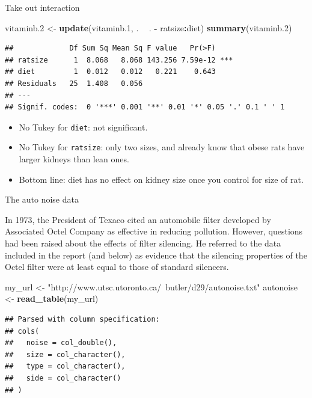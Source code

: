 \documentclass[ignorenonframetext,]{beamer}
\newenvironment{Shaded}{\begin{snugshade}}{\end{snugshade}}
\newcommand{\FloatTok}[1]{\textcolor[rgb]{0.00,0.00,0.81}{#1}}
\newcommand{\KeywordTok}[1]{\textcolor[rgb]{0.13,0.29,0.53}{\textbf{#1}}}
\newcommand{\NormalTok}[1]{#1}
\newcommand{\OperatorTok}[1]{\textcolor[rgb]{0.81,0.36,0.00}{\textbf{#1}}}
\newcommand{\StringTok}[1]{\textcolor[rgb]{0.31,0.60,0.02}{#1}}
\begin{document}
\begin{frame}[fragile]{Take out interaction}
\protect\hypertarget{take-out-interaction}{}

\begin{Shaded}
\begin{Highlighting}[]
\NormalTok{vitaminb}\FloatTok{.2}\NormalTok{ <-}\StringTok{ }\KeywordTok{update}\NormalTok{(vitaminb}\FloatTok{.1}\NormalTok{, . }\OperatorTok{~}\StringTok{ }\NormalTok{. }\OperatorTok{-}\StringTok{ }\NormalTok{ratsize}\OperatorTok{:}\NormalTok{diet)}
\KeywordTok{summary}\NormalTok{(vitaminb}\FloatTok{.2}\NormalTok{)}
\end{Highlighting}
\end{Shaded}

\begin{verbatim}
##             Df Sum Sq Mean Sq F value   Pr(>F)    
## ratsize      1  8.068   8.068 143.256 7.59e-12 ***
## diet         1  0.012   0.012   0.221    0.643    
## Residuals   25  1.408   0.056                     
## ---
## Signif. codes:  0 '***' 0.001 '**' 0.01 '*' 0.05 '.' 0.1 ' ' 1
\end{verbatim}

\begin{itemize}
\item
  No Tukey for \texttt{diet}: not significant.
\item
  No Tukey for \texttt{ratsize}: only two sizes, and already know that
  obese rats have larger kidneys than lean ones.
\item
  Bottom line: diet has no effect on kidney size once you control for
  size of rat.
\end{itemize}

\end{frame}

\begin{frame}[fragile]{The auto noise data}
\protect\hypertarget{the-auto-noise-data}{}

In 1973, the President of Texaco cited an automobile filter developed by
Associated Octel Company as effective in reducing pollution. However,
questions had been raised about the effects of filter silencing. He
referred to the data included in the report (and below) as evidence that
the silencing properties of the Octel filter were at least equal to
those of standard silencers.

\begin{Shaded}
\begin{Highlighting}[]
\NormalTok{my_url <-}\StringTok{ "http://www.utsc.utoronto.ca/~butler/d29/autonoise.txt"}
\NormalTok{autonoise <-}\StringTok{ }\KeywordTok{read_table}\NormalTok{(my_url)}
\end{Highlighting}
\end{Shaded}

\begin{verbatim}
## Parsed with column specification:
## cols(
##   noise = col_double(),
##   size = col_character(),
##   type = col_character(),
##   side = col_character()
## )
\end{verbatim}

\end{frame}
\end{document}
